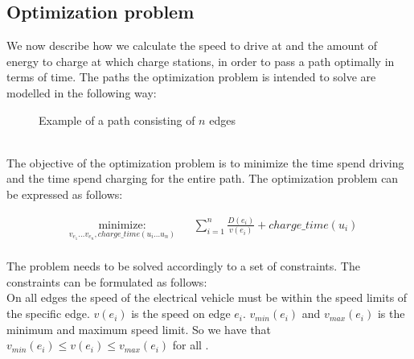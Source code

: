 \subsection{Optimization problem}
We now describe how we calculate the speed to drive at and the amount of energy to charge at which charge stations, in order to pass a path optimally in terms of time. The paths the optimization problem is intended to solve are modelled in the following way: \\
\begin{figure}[h!]
\centering
    \caption{Example of a path consisting of $n$ edges} \label{fig:pathexample}
\end{figure} \\

The objective of the optimization problem is to minimize the time spend driving 
and the time spend charging for the entire path. The optimization problem can be expressed as follows:

\begin{equation}
	\begin{aligned} & \underset{v_{e_{1}} \dots v_{e_{n}}, charge\_time(u_i \dots u_n)}
	{\text{minimize:}}
	& & \sum_{i=1}^{n} \frac{D(e_i)}{v(e_i)} + charge\_time(u_i) \\
	\end{aligned}
\end{equation}\label{eq:objfunction}

The problem needs to be solved accordingly to a set of constraints. The constraints can be formulated as follows: \\
On all edges the speed of the electrical vehicle must be within the speed limits of the specific edge. $v(e_i)$ is the speed on edge $e_i$. $v_{min}(e_i)$ and $v_{max}(e_i)$ is the minimum and maximum speed limit. So we have that $v_{min}(e_i) \leq v(e_i) \leq v_{max}(e_i)$ for all .
 
